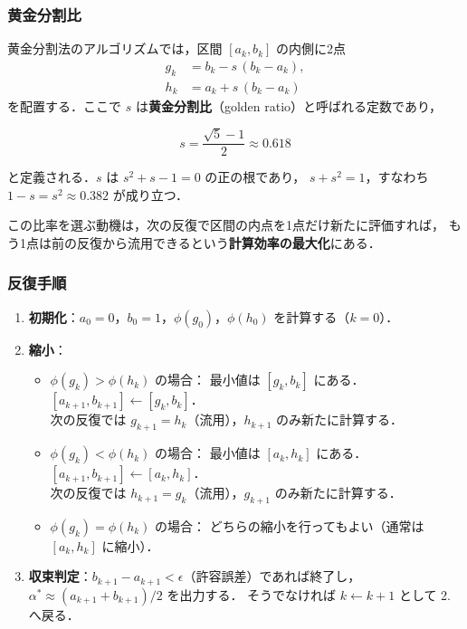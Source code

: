 \subsubsection*{黄金分割比}

黄金分割法のアルゴリズムでは，区間 $[a_k, b_k]$ の内側に2点
\begin{align}
  g_k &= b_k - s\,(b_k - a_k), \label{eq:appendix-A-gk} \\
  h_k &= a_k + s\,(b_k - a_k)  \label{eq:appendix-A-hk}
\end{align}
を配置する．ここで $s$ は\textbf{黄金分割比}（golden ratio）と呼ばれる定数であり，

\begin{equation}
  s = \frac{\sqrt{5} - 1}{2} \approx 0.618
  \label{eq:appendix-A-goldenratio}
\end{equation}

と定義される．$s$ は $s^2 + s - 1 = 0$ の正の根であり，
$s + s^2 = 1$，すなわち $1 - s = s^2 \approx 0.382$ が成り立つ．

この比率を選ぶ動機は，次の反復で区間の内点を1点だけ新たに評価すれば，
もう1点は前の反復から流用できるという\textbf{計算効率の最大化}にある．

\subsubsection*{反復手順}

\begin{enumerate}
  \item \textbf{初期化}：$a_0 = 0$，$b_0 = 1$，$\phi(g_0)$，$\phi(h_0)$ を計算する（$k = 0$）．
  \item \textbf{縮小}：
    \begin{itemize}
      \item $\phi(g_k) > \phi(h_k)$ の場合：\;
            最小値は $[g_k, b_k]$ にある．
            $[a_{k+1}, b_{k+1}] \leftarrow [g_k, b_k]$．\\
            次の反復では $g_{k+1} = h_k$（流用），$h_{k+1}$ のみ新たに計算する．
      \item $\phi(g_k) < \phi(h_k)$ の場合：\;
            最小値は $[a_k, h_k]$ にある．
            $[a_{k+1}, b_{k+1}] \leftarrow [a_k, h_k]$．\\
            次の反復では $h_{k+1} = g_k$（流用），$g_{k+1}$ のみ新たに計算する．
      \item $\phi(g_k) = \phi(h_k)$ の場合：\;
            どちらの縮小を行ってもよい（通常は $[a_k, h_k]$ に縮小）．
    \end{itemize}
  \item \textbf{収束判定}：$b_{k+1} - a_{k+1} < \epsilon$（許容誤差）であれば終了し，
        $\alpha^* \approx (a_{k+1} + b_{k+1}) / 2$ を出力する．
        そうでなければ $k \leftarrow k+1$ として 2. へ戻る．
\end{enumerate}

